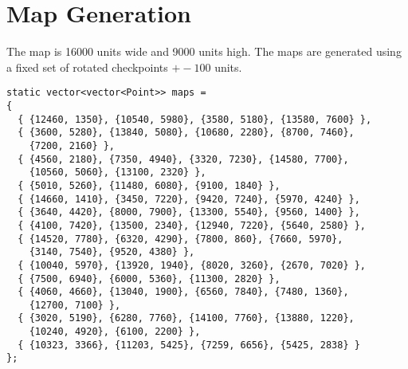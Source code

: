 \documentclass[main.tex]{subfiles}
\begin{document}
 
\section{Map Generation}

\par
The map is 16000 units wide and 9000 units high.
The maps are generated using a fixed set of rotated checkpoints $+-100$ units.

\begin{lstlisting}
static vector<vector<Point>> maps =
{
  { {12460, 1350}, {10540, 5980}, {3580, 5180}, {13580, 7600} },
  { {3600, 5280}, {13840, 5080}, {10680, 2280}, {8700, 7460},
    {7200, 2160} },
  { {4560, 2180}, {7350, 4940}, {3320, 7230}, {14580, 7700}, 
    {10560, 5060}, {13100, 2320} },
  { {5010, 5260}, {11480, 6080}, {9100, 1840} },
  { {14660, 1410}, {3450, 7220}, {9420, 7240}, {5970, 4240} },
  { {3640, 4420}, {8000, 7900}, {13300, 5540}, {9560, 1400} },
  { {4100, 7420}, {13500, 2340}, {12940, 7220}, {5640, 2580} },
  { {14520, 7780}, {6320, 4290}, {7800, 860}, {7660, 5970},
    {3140, 7540}, {9520, 4380} },
  { {10040, 5970}, {13920, 1940}, {8020, 3260}, {2670, 7020} },
  { {7500, 6940}, {6000, 5360}, {11300, 2820} },
  { {4060, 4660}, {13040, 1900}, {6560, 7840}, {7480, 1360},
    {12700, 7100} },
  { {3020, 5190}, {6280, 7760}, {14100, 7760}, {13880, 1220},
    {10240, 4920}, {6100, 2200} },
  { {10323, 3366}, {11203, 5425}, {7259, 6656}, {5425, 2838} }
};
\end{lstlisting}

\def\checkpoints{{
  { {12460, 1350}, {10540, 5980}, {3580, 5180}, {13580, 7600} },
  { {3600, 5280}, {13840, 5080}, {10680, 2280}, {8700, 7460},
    {7200, 2160} },
  { {4560, 2180}, {7350, 4940}, {3320, 7230}, {14580, 7700}, 
    {10560, 5060}, {13100, 2320} },
  { {5010, 5260}, {11480, 6080}, {9100, 1840} },
  { {14660, 1410}, {3450, 7220}, {9420, 7240}, {5970, 4240} },
  { {3640, 4420}, {8000, 7900}, {13300, 5540}, {9560, 1400} },
  { {4100, 7420}, {13500, 2340}, {12940, 7220}, {5640, 2580} },
  { {14520, 7780}, {6320, 4290}, {7800, 860}, {7660, 5970},
    {3140, 7540}, {9520, 4380} },
  { {10040, 5970}, {13920, 1940}, {8020, 3260}, {2670, 7020} },
  { {7500, 6940}, {6000, 5360}, {11300, 2820} },
  { {4060, 4660}, {13040, 1900}, {6560, 7840}, {7480, 1360},
    {12700, 7100} },
  { {3020, 5190}, {6280, 7760}, {14100, 7760}, {13880, 1220},
    {10240, 4920}, {6100, 2200} },
  { {10323, 3366}, {11203, 5425}, {7259, 6656}, {5425, 2838} }
}}
\end{document}
